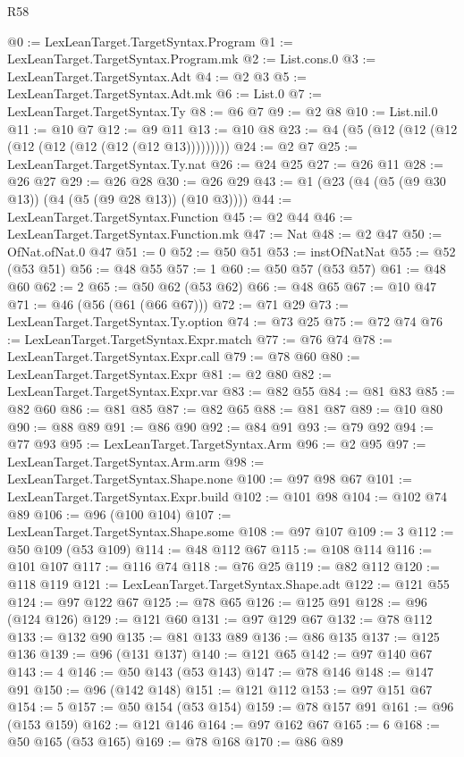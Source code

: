 \begin{lexlean}{R58}
\begin{coremodule}
@0 := LexLeanTarget.TargetSyntax.Program
@1 := LexLeanTarget.TargetSyntax.Program.mk
@2 := List.cons.{0}
@3 := LexLeanTarget.TargetSyntax.Adt
@4 := @2 @3
@5 := LexLeanTarget.TargetSyntax.Adt.mk
@6 := List.{0}
@7 := LexLeanTarget.TargetSyntax.Ty
@8 := @6 @7
@9 := @2 @8
@10 := List.nil.{0}
@11 := @10 @7
@12 := @9 @11
@13 := @10 @8
@23 := @4 (@5 (@12 (@12 (@12 (@12 (@12 (@12 (@12 (@12 @13)))))))))
@24 := @2 @7
@25 := LexLeanTarget.TargetSyntax.Ty.nat
@26 := @24 @25
@27 := @26 @11
@28 := @26 @27
@29 := @26 @28
@30 := @26 @29
@43 := @1 (@23 (@4 (@5 (@9 @30 @13)) (@4 (@5 (@9 @28 @13)) (@10 @3))))
@44 := LexLeanTarget.TargetSyntax.Function
@45 := @2 @44
@46 := LexLeanTarget.TargetSyntax.Function.mk
@47 := Nat
@48 := @2 @47
@50 := OfNat.ofNat.{0} @47
@51 := 0
@52 := @50 @51
@53 := instOfNatNat
@55 := @52 (@53 @51)
@56 := @48 @55
@57 := 1
@60 := @50 @57 (@53 @57)
@61 := @48 @60
@62 := 2
@65 := @50 @62 (@53 @62)
@66 := @48 @65
@67 := @10 @47
@71 := @46 (@56 (@61 (@66 @67)))
@72 := @71 @29
@73 := LexLeanTarget.TargetSyntax.Ty.option
@74 := @73 @25
@75 := @72 @74
@76 := LexLeanTarget.TargetSyntax.Expr.match
@77 := @76 @74
@78 := LexLeanTarget.TargetSyntax.Expr.call
@79 := @78 @60
@80 := LexLeanTarget.TargetSyntax.Expr
@81 := @2 @80
@82 := LexLeanTarget.TargetSyntax.Expr.var
@83 := @82 @55
@84 := @81 @83
@85 := @82 @60
@86 := @81 @85
@87 := @82 @65
@88 := @81 @87
@89 := @10 @80
@90 := @88 @89
@91 := @86 @90
@92 := @84 @91
@93 := @79 @92
@94 := @77 @93
@95 := LexLeanTarget.TargetSyntax.Arm
@96 := @2 @95
@97 := LexLeanTarget.TargetSyntax.Arm.arm
@98 := LexLeanTarget.TargetSyntax.Shape.none
@100 := @97 @98 @67
@101 := LexLeanTarget.TargetSyntax.Expr.build
@102 := @101 @98
@104 := @102 @74 @89
@106 := @96 (@100 @104)
@107 := LexLeanTarget.TargetSyntax.Shape.some
@108 := @97 @107
@109 := 3
@112 := @50 @109 (@53 @109)
@114 := @48 @112 @67
@115 := @108 @114
@116 := @101 @107
@117 := @116 @74
@118 := @76 @25
@119 := @82 @112
@120 := @118 @119
@121 := LexLeanTarget.TargetSyntax.Shape.adt
@122 := @121 @55
@124 := @97 @122 @67
@125 := @78 @65
@126 := @125 @91
@128 := @96 (@124 @126)
@129 := @121 @60
@131 := @97 @129 @67
@132 := @78 @112
@133 := @132 @90
@135 := @81 @133 @89
@136 := @86 @135
@137 := @125 @136
@139 := @96 (@131 @137)
@140 := @121 @65
@142 := @97 @140 @67
@143 := 4
@146 := @50 @143 (@53 @143)
@147 := @78 @146
@148 := @147 @91
@150 := @96 (@142 @148)
@151 := @121 @112
@153 := @97 @151 @67
@154 := 5
@157 := @50 @154 (@53 @154)
@159 := @78 @157 @91
@161 := @96 (@153 @159)
@162 := @121 @146
@164 := @97 @162 @67
@165 := 6
@168 := @50 @165 (@53 @165)
@169 := @78 @168
@170 := @86 @89

\end{coremodule}
\end{lexlean}
